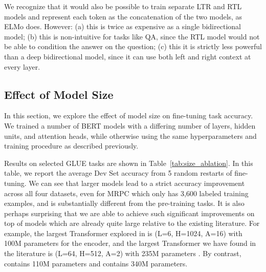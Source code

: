 We recognize that it would also be possible to train separate LTR and RTL models and represent each token as the concatenation of the two models, as ELMo does. However: (a) this is twice as expensive as a single bidirectional model; (b) this is non-intuitive for tasks like QA, since the RTL model would not be able to condition the answer on the question; (c) this it is strictly less powerful than a deep bidirectional model, since it can use both left and right context at every layer.


\subsection{Effect of Model Size}
\label{sec:model_size_ablation}

In this section, we explore the effect of model size on fine-tuning task accuracy. We trained a number of BERT models with a differing number of layers, hidden units, and attention heads, while otherwise using the same hyperparameters and training procedure as described previously.

Results on selected GLUE tasks are shown in Table~\ref{tab:size_ablation}. In this table, we report the average Dev Set accuracy from 5 random restarts of fine-tuning. We can see that larger models lead to a strict accuracy improvement across all four datasets, even for MRPC which only has 3,600 labeled training examples, and is substantially different from the pre-training tasks. It is also perhaps surprising that we are able to achieve such significant improvements on top of models which are already quite large relative to the existing literature. For example, the largest Transformer explored in \citet{vaswani-etal:2017:_atten} is (L=6, H=1024, A=16) with 100M parameters for the encoder, and the largest Transformer we have found in the literature is (L=64, H=512, A=2) with 235M parameters \cite{alrfou:2018}. By contrast, \bertbase contains 110M parameters and \bertlarge contains 340M parameters.



